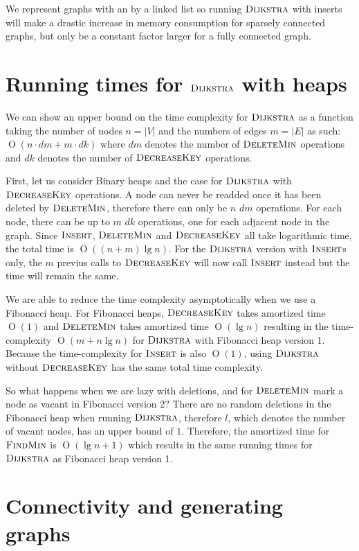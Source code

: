 \documentclass[oneside,11pt,openright]{report}
\newcommand{\BigO}[1]{\ensuremath{\operatorname{O}\left(#1\right)}}
\newcommand{\FindMin}{\textsc{FindMin}}
\newcommand{\Insert}{\textsc{Insert}}
\newcommand{\DeleteMin}{\textsc{DeleteMin}}
\newcommand{\DecreaseKey}{\textsc{DecreaseKey}}
\newcommand{\Dijkstra}{\textsc{Dijkstra}}
\begin{document}
We represent graphs with an by a linked list so running $\Dijkstra$ with inserts will make a drastic increase in memory consumption for sparsely connected graphs, but only be a constant factor larger for a fully connected graph.

\section{Running times for $\Dijkstra$ with heaps}

We can show an upper bound on the time complexity for $\Dijkstra$ as a function taking the number of nodes $n=|V|$ and the numbers of edges $m=|E|$ as such: $\BigO{n \cdot dm + m \cdot dk}$ where $dm$ denotes the number of $\DeleteMin$ operations and $dk$ denotes the number of $\DecreaseKey$ operations.

First, let us consider Binary heaps and the case for $\Dijkstra$ with $\DecreaseKey$ operations. A node can never be readded once it has been deleted by $\DeleteMin$, therefore there can only be $n$ $dm$ operations. For each node, there can be up to $m$ $dk$ operations, one for each adjacent node in the graph. Since $\Insert$, $\DeleteMin$ and $\DecreaseKey$ all take logarithmic time, the total time is $\BigO{(n+m)\lg n}$. For the $\Dijkstra$ version with $\Insert$s only, the $m$ previus calls to $\DecreaseKey$ will now call $\Insert$ instead but the time will remain the same.

We are able to reduce the time complexity asymptotically when we use a Fibonacci heap. For Fibonacci heaps, $\DecreaseKey $ takes amortized time $\BigO{1}$ and $\DeleteMin$ takes amortized time $\BigO{\lg n}$ resulting in the time-complexity $\BigO{m+n\lg n}$ for $\Dijkstra$ with Fibonacci heap version 1. Because the time-complexity for $\Insert$ is also $\BigO{1}$, using $\Dijkstra$ without $\DecreaseKey$ has the same total time complexity.

So what happens when we are lazy with deletions, and for $\DeleteMin$ mark a node as vacant in Fibonacci version 2? There are no random deletions in the Fibonacci heap when running $\Dijkstra$, therefore $l$, which denotes the number of vacant nodes, has an upper bound of $1$. Therefore, the amortized time for $\FindMin$ is $\BigO{\lg n + 1}$ which results in the same running times for $\Dijkstra$ as Fibonacci heap version 1.

\section{Connectivity and generating graphs}
\end{document}
